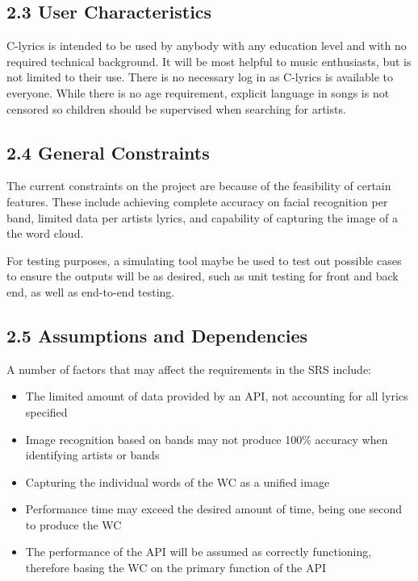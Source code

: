 \documentclass[]{article}
\begin{document}
\subsection{2.3 User Characteristics}\label{user-characteristics}

C-lyrics is intended to be used by anybody with any education level and
with no required technical background. It will be most helpful to music
enthusiasts, but is not limited to their use. There is no necessary log
in as C-lyrics is available to everyone. While there is no age
requirement, explicit language in songs is not censored so children
should be supervised when searching for artists.

\subsection{2.4 General Constraints}\label{general-constraints}

The current constraints on the project are because of the feasibility of
certain features. These include achieving complete accuracy on facial
recognition per band, limited data per artists lyrics, and capability of
capturing the image of a the word cloud.

For testing purposes, a simulating tool maybe be used to test out
possible cases to ensure the outputs will be as desired, such as unit
testing for front and back end, as well as end-to-end testing.

\subsection{2.5 Assumptions and
Dependencies}\label{assumptions-and-dependencies}

A number of factors that may affect the requirements in the SRS include:

\begin{itemize}
\itemsep1pt\parskip0pt
\item
  The limited amount of data provided by an API, not accounting for all
  lyrics specified
\item
  Image recognition based on bands may not produce 100\% accuracy when
  identifying artists or bands
\item
  Capturing the individual words of the WC as a unified image
\item
  Performance time may exceed the desired amount of time, being one
  second to produce the WC
\item
  The performance of the API will be assumed as correctly functioning,
  therefore basing the WC on the primary function of the API
\end{itemize}
\end{document}
